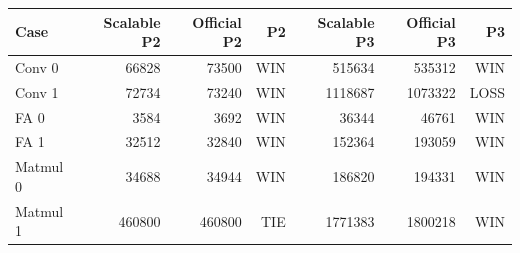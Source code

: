 \begin{tabular}{lrrrrrr}
\toprule
Case & Scalable P2 & Official P2 & P2 & Scalable P3 & Official P3 & P3 \\
\midrule
Conv 0 & 66828 & 73500 & WIN & 515634 & 535312 & WIN \\
Conv 1 & 72734 & 73240 & WIN & 1118687 & 1073322 & LOSS \\
FA 0 & 3584 & 3692 & WIN & 36344 & 46761 & WIN \\
FA 1 & 32512 & 32840 & WIN & 152364 & 193059 & WIN \\
Matmul 0 & 34688 & 34944 & WIN & 186820 & 194331 & WIN \\
Matmul 1 & 460800 & 460800 & TIE & 1771383 & 1800218 & WIN \\
\bottomrule
\end{tabular}
